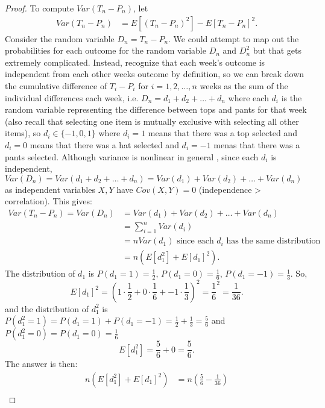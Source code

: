 \documentclass[a4paper]{article}
\begin{document}
\begin{enumerate}
\begin{proof}
      To compute $Var(T_n - P_n)$, let
       \begin{align*}
         Var(T_n - P_n) &= E[(T_n - P_n)^2] - E[T_n - P_n]^2 
      .\end{align*}
      Consider the random variable $D_n = T_n - P_n$. 
      We could attempt to map out the probabilities for each outcome for the random variable $D_n$ and $D_n^2$ but that
      gets extremely complicated. Instead, recognize that each week's outcome is independent from each other
      weeks outcome by definition, so we can break down the cumulative difference of $T_i - P_i$ for $i = 1,2,\ldots,n$ 
      weeks as the sum of the individual differences each week, i.e. $D_n = d_1 + d_2 + \ldots + d_n$ where each
      $d_i$ is the random variable representing the difference between tops and pants for that week (also recall
      that selecting one item is mutually exclusive with selecting all other items), so 
      $d_i \in \{-1,0,1\}$ where $d_i=1$ means that there was a top selected and $d_i = 0$ means that there was 
      a hat selected and  $d_i=-1$ menas that there was a pants selected. Although variance is nonlinear in general
      , since each $d_i$ is independent, $Var(D_n) = Var(d_1 + d_2 + \ldots + d_n) = Var(d_1) + Var(d_2) + 
      \ldots + Var(d_n)$ as independent variables $X,Y$ have  $Cov(X,Y) = 0$ (independence > correlation). This 
      gives:
      \begin{align*}
        Var(T_n - P_n) = Var(D_n) &= Var(d_1) + Var(d_2) + \ldots + Var(d_n) \\ 
                                  &= \sum_{i=1}^n Var(d_i) \\
                                  &= nVar(d_1) \text{ since each $d_i$ has the same distribution} \\
                                  &= n (E[d_1^2] + E[d_1]^2) 
      .\end{align*}
      The distribution of $d_1$ is  $P(d_1 = 1) = \frac{1}{2}$, $P(d_1 = 0) = \frac{1}{6}$, $P(d_1 = -1) = \frac{1}{3}$. 
      So,
      \[
        E[d_1]^2 = \left( 1 \cdot \frac{1}{2} + 0 \cdot \frac{1}{6} + -1 \cdot \frac{1}{3}\right)^2 = \frac{1}{6}^2 = \frac{1}{36} 
      .\]
      and the distribution of $d_1^2$ is  $P(d_1^2 = 1) = P(d_1=1) + P(d_1=-1) = \frac{1}{2} + \frac{1}{3} = \frac{5}{6}$ and 
      $P(d_1^2 = 0) = P(d_1=0) = \frac{1}{6}$
      \[
        E[d_1^2] = \frac{5}{6} + 0 = \frac{5}{6} 
      .\]
      The answer is then:
      \begin{align*}
        n (E[d_1^2] + E[d_1]^2) &= n (\frac{5}{6} - \frac{1}{36})\\

\end{align*}
\end{proof}
\end{enumerate}
\end{document}
